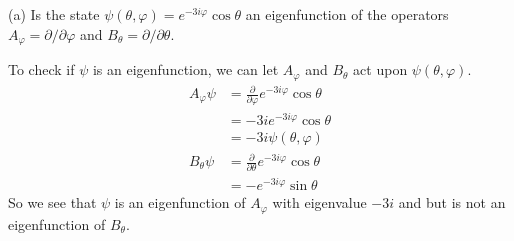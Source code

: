 \documentclass[a4paper, 11pt]{article}
\newenvironment{solution}{%
	\begin{list}{}{%
			\setlength{\topsep}{0pt}%
			\setlength{\leftmargin}{1.5cm}%
			\setlength{\rightmargin}{1.5cm}%
			\setlength{\listparindent}{\parindent}%
			\setlength{\itemindent}{\parindent}%
			\setlength{\parsep}{\parskip}%
		}%
		\item[]}{\end{list}}
\begin{document}
 (a) Is the state $\psi(\theta, \varphi) = e^{-3i\varphi}\cos\theta$ an eigenfunction of the operators $A_\varphi = \partial/\partial\varphi$ and $B_\theta = \partial/\partial\theta$. \\
	\begin{solution}
		\noindent To check if $\psi$ is an eigenfunction, we can let $A_\varphi$ and $B_\theta$ act upon $\psi(\theta, \varphi)$. 	
			\begin{align*}
				A_\varphi\psi &= \frac{\partial}{\partial \varphi}e^{-3i\varphi}\cos\theta \\
					&= -3ie^{-3i\varphi}\cos\theta \\ 
					&= -3i\psi(\theta, \varphi) \\ 
				B_\theta\psi &= \frac{\partial}{\partial \theta}e^{-3i\varphi}\cos\theta \\ 
					&= -e^{-3i\varphi}\sin\theta 
			\end{align*}
		So we see that $\psi$ is an eigenfunction of $A_\varphi$ with eigenvalue $-3i$ and but is not an eigenfunction of $B_\theta$. 
		\end{solution}
\end{document}
